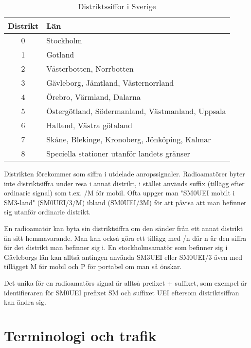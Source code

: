 \begin{table}[h]
	\centering
\begin{tabular}{cl}
	\textbf{Distrikt} & \textbf{Län}                                     \\ \hline %
	      0        & Stockholm                                        \\
	      1        & Gotland                                          \\
	      2        & Västerbotten, Norrbotten                         \\
	      3        & Gävleborg, Jämtland, Västernorrland              \\
	      4        & Örebro, Värmland, Dalarna                        \\
	      5        & Östergötland, Södermanland, Västmanland, Uppsala \\
	      6        & Halland, Västra götaland                         \\
	      7        & Skåne, Blekinge, Kronoberg, Jönköping, Kalmar    \\
	      8        & Speciella stationer utanför landets gränser
\end{tabular}
\caption{Distriktssiffor i Sverige}
\end{table}

Distrikten förekommer som siffra i utdelade anropssignaler. Radioamatörer 
byter inte distriktsiffra under resa i annat distrikt, i stället används 
suffix (tillägg efter ordinarie signal) som t.ex. /M för mobil. Ofta uppger 
man "SM0UEI mobilt i SM3-land" (SM0UEI/3/M) ibland (SM0UEI/3M) för att 
påvisa att man befinner sig utanför ordinarie distrikt.

En radioamatör kan byta sin distriktsiffra om den sänder från ett
annat distrikt än sitt hemmavarande. Man kan också göra ett tillägg
med /n där n är den siffra för det distrikt man befinner sig i. En
stockholmsamatör som befinner sig i Gävleborgs län kan alltså antingen
använda SM3UEI eller SM0UEI/3 även med tillägget M för mobil och P för
portabel om man så önskar.

Det unika för en radioamatörs signal är alltså prefixet + suffixet,
som exempel är identifieraren för SM0UEI prefixet SM och suffixet UEI
eftersom distriktsiffran kan ändra sig. 

\section{Terminologi och trafik}

